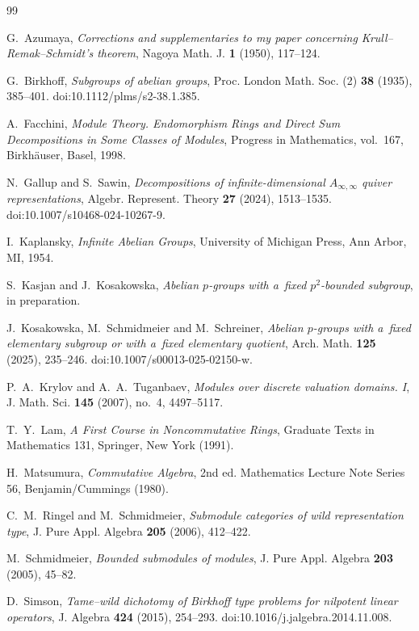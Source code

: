 \documentclass[11pt]{article}
\theoremstyle{definition}
\begin{document}
\begin{thebibliography}{99}
	
	G.~Azumaya,
	\emph{Corrections and supplementaries to my paper concerning
		Krull--Remak--Schmidt's theorem},
	Nagoya Math. J. \textbf{1} (1950), 117--124.
	
	G.~Birkhoff,
	\emph{Subgroups of abelian groups},
	Proc. London Math. Soc. (2) \textbf{38} (1935), 385--401.
	doi:10.1112/plms/s2-38.1.385.
	
	A.~Facchini,
	\emph{Module Theory. Endomorphism Rings and Direct Sum
		Decompositions in Some Classes of Modules},
	Progress in Mathematics, vol.~167,
	Birkh\"auser, Basel, 1998.
	
	N.~Gallup and S.~Sawin,
	\emph{Decompositions of infinite-dimensional
		$A_{\infty,\infty}$ quiver representations},
	Algebr. Represent. Theory \textbf{27} (2024), 1513--1535.
	doi:10.1007/s10468-024-10267-9.
	
	I.~Kaplansky,
	\emph{Infinite Abelian Groups},
	University of Michigan Press, Ann Arbor, MI, 1954.
	
	S.~Kasjan and J.~Kosakowska,
	\emph{Abelian $p$-groups with a~fixed $p^2$-bounded subgroup},
	in preparation.
	
	J.~Kosakowska, M.~Schmidmeier and M.~Schreiner,
	\emph{Abelian $p$-groups with a~fixed elementary subgroup or with a~fixed elementary quotient},
	Arch. Math. \textbf{125} (2025), 235--246.
	doi:10.1007/s00013-025-02150-w.
	
	P.~A.~Krylov and A.~A.~Tuganbaev,
	\emph{Modules over discrete valuation domains. I},
	J. Math. Sci. \textbf{145} (2007), no.~4, 4497--5117.
	
	T.~Y.~Lam,
	\textit{A First Course in Noncommutative Rings},
	Graduate Texts in Mathematics 131, Springer, New York (1991).
	
	H.~Matsumura,
	\textit{Commutative Algebra}, 2nd ed.
	Mathematics Lecture Note Series 56, Benjamin/Cummings (1980).
	
	C.~M.~Ringel and M.~Schmidmeier,
	\emph{Submodule categories of wild representation type},
	J. Pure Appl. Algebra \textbf{205} (2006), 412--422.
	
	M.~Schmidmeier,
	\emph{Bounded submodules of modules},
	J. Pure Appl. Algebra \textbf{203} (2005), 45--82.
	
	D.~Simson,
	\emph{Tame--wild dichotomy of Birkhoff type problems
		for nilpotent linear operators},
	J. Algebra \textbf{424} (2015), 254--293.
	doi:10.1016/j.jalgebra.2014.11.008.
	
\end{thebibliography}
\end{document}
